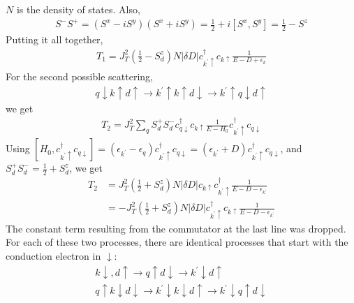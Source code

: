 \documentclass[twoside]{report}
\numberwithin{equation}{section}
\begin{document}
\(N\) is the density of states.
Also,
\begin{equation}\begin{aligned}
	S^- S^+= \left(S^x - iS^y\right)\left(S^x + iS^y\right) = \frac{1}{2} + i\left[S^x,S^y\right] = \frac{1}{2} - S^z
\end{aligned}\end{equation} 
Putting it all together, 
\begin{equation}\begin{aligned}
	T_1 = J_T^2\left(\frac{1}{2} - S_d^z\right)N|\delta D|c^\dagger_{k^\prime \uparrow}c_{k\uparrow}\frac{1}{E - D + \epsilon_k}
\end{aligned}\end{equation}
For the second possible scattering,
\begin{equation}\begin{aligned}
q \downarrow k \uparrow d\uparrow \rightarrow k^\prime \uparrow k \uparrow d\downarrow \rightarrow k^\prime\uparrow q \downarrow d\uparrow
\end{aligned}\end{equation}
we get
\begin{equation}\begin{aligned}
T_2 = J_T^2\sum_q S_d^+S_d^- c^\dagger_{q\downarrow}c_{k\uparrow}\frac{1}{E - H_0}c^\dagger_{k^\prime \uparrow}c_{q\downarrow}
\end{aligned}\end{equation}
Using \(\left[H_0, c^\dagger_{k^\prime \uparrow}c_{q\downarrow}\right] = \left(\epsilon_{k^\prime} - \epsilon_q\right) c^\dagger_{k^\prime \uparrow}c_{q\downarrow}= \left(\epsilon_{k^\prime} +D\right) c^\dagger_{k^\prime \uparrow}c_{q\downarrow}\), and \(S_d^+ S_d^- = \frac{1}{2}+S_d^z\), we get
\begin{equation}\begin{aligned}
	T_2 &= J_T^2 \left(\frac{1}{2}+S_d^z\right) N |\delta D|c_{k\uparrow}c^\dagger_{k^\prime \uparrow} \frac{1}{E - D - \epsilon_{k^\prime}} \\
	    &=-J_T^2 \left(\frac{1}{2}+S_d^z\right) N |\delta D|c^\dagger_{k^\prime \uparrow} c_{k\uparrow}\frac{1}{E - D - \epsilon_{k^\prime}}
\end{aligned}\end{equation}
The constant term resulting from the commutator at the last line was dropped.
For each of these two processes, there are identical processes that start with the conduction electron in \(\downarrow\):
\begin{gather}
k \downarrow, d\uparrow \rightarrow q \uparrow d \downarrow \rightarrow k^\prime \downarrow d\uparrow\\
q \uparrow k \downarrow d\downarrow \rightarrow k^\prime \downarrow k \downarrow d\uparrow \rightarrow k^\prime\downarrow q \uparrow d\downarrow
\end{gather}
\end{document}
